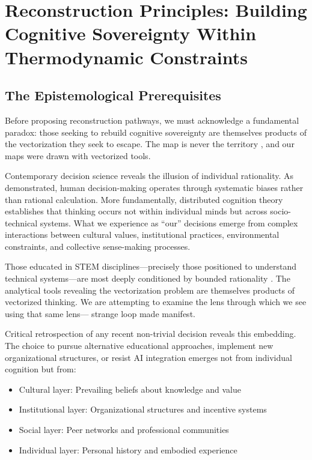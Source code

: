 \section{Reconstruction Principles: Building Cognitive Sovereignty Within Thermodynamic Constraints}

\subsection{The Epistemological Prerequisites}

Before proposing reconstruction pathways, we must acknowledge a fundamental paradox: those seeking to rebuild cognitive sovereignty are themselves products of the vectorization they seek to escape. The map is never the territory \citep{korzybski1933}, and our maps were drawn with vectorized tools.

Contemporary decision science reveals the illusion of individual rationality. As \citet{kahneman2011} demonstrated, human decision-making operates through systematic biases rather than rational calculation. More fundamentally, distributed cognition theory \citep{hutchins1995} establishes that thinking occurs not within individual minds but across socio-technical systems. What we experience as ``our'' decisions emerge from complex interactions between cultural values, institutional practices, environmental constraints, and collective sense-making processes.

Those educated in STEM disciplines---precisely those positioned to understand technical systems---are most deeply conditioned by bounded rationality \citep{simon1991}. The analytical tools revealing the vectorization problem are themselves products of vectorized thinking. We are attempting to examine the lens through which we see using that same lens---\citet{hofstadter1979} strange loop made manifest.

Critical retrospection of any recent non-trivial decision reveals this embedding. The choice to pursue alternative educational approaches, implement new organizational structures, or resist AI integration emerges not from individual cognition but from:
\begin{itemize}
\item Cultural layer: Prevailing beliefs about knowledge and value \citep{schein1985}
\item Institutional layer: Organizational structures and incentive systems \citep{dimaggio1983}
\item Social layer: Peer networks and professional communities \citep{granovetter1985}
\item Individual layer: Personal history and embodied experience \citep{bourdieu1990}
\end{itemize}

